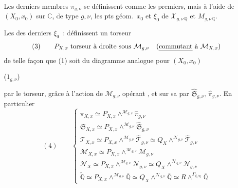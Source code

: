 \documentclass[11pt,a4paper]{article}
\begin{document}
Les derniers membres $\hat\pi_{g,\nu}$  se définissent
comme les premiers, mais à l'aide de $(X_0,x_0)$ sur $\mathbb{C}$, de type
$g,\nu$,  les pts géom.\ $x_0$ et $\xi_0$ de
\struck{\ill{}} $\mathcal{X}_{g,\nu\,\mathbb{Q}}$ et $M_{g,\nu\,\mathbb{Q}}$.

Les  des derniers  $\xi_0$~:
\uncertain{$\xi$} définissent un torseur
\[
  (3)\qquad P_{X,x}\ \text{torseur à droite sous } \mathcal{M}_{g,\nu}
  \quad(\text{\uncertain{commutant} à } \mathcal{M}_{X,x})
\]
de telle façon que (1) soit  du diagramme analogue pour
$(X_0,x_0)$

($1_{g,\nu}$)


par le torseur, grâce à l'action de $\mathcal{M}_{g,\nu}$ opérant
, et sur sa
 par $\hat{\mathfrak{S}}_{g,\nu}$, $\hat\pi_{g,\nu}$.
En particulier
\[
  (4)\qquad
  \begin{cases}
    \pi_{X,x}\simeq P_{X,x}\wedge^{\mathcal{M}_{g,\nu}}\hat\pi_{g,\nu}\\
    \mathfrak{S}_{X,x}\simeq P_{X,x}\wedge^{\mathcal{M}_{g,\nu}}\hat{\mathfrak{S}}_{g,\nu}\\
    \mathcal{T}_{X,x}\simeq P_{X,x}\wedge^{\mathcal{M}_{g,\nu}}\hat{\mathcal{T}}_{g,\nu}
      \simeq Q_X\wedge^{\mathcal{N}_{g,\nu}}\hat{\mathcal{T}}_{g,\nu}\\
    \mathcal{M}_{X,x}\simeq P_{X,x}\wedge^{\mathcal{M}_{g,\nu}}\mathcal{M}_{g,\nu}\\
    \mathcal{N}_X\simeq P_{X,x}\wedge^{\mathcal{M}_{g,\nu}}\mathcal{N}_{g,\nu}
      \simeq Q_X\wedge^{\mathcal{N}_{g,\nu}}\mathcal{N}_{g,\nu}\\
    \tilde{\mathbb{Q}}\simeq P_{X,x}\wedge^{\mathcal{M}_{g,\nu}}\bar{\mathbb{Q}}
      \simeq Q_X\wedge^{\mathcal{N}_{g,\nu}}\bar{\mathbb{Q}}
      \simeq R\wedge^{\Gamma_{\bar{\mathbb{Q}}/\mathbb{Q}}}\bar{\mathbb{Q}}
  \end{cases}
\]
\end{document}
